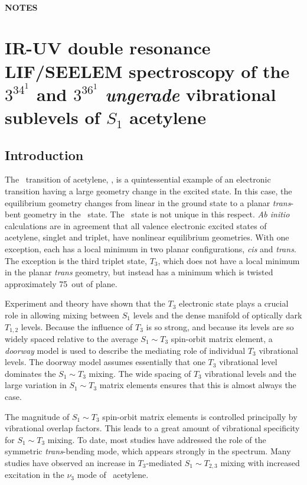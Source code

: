 \documentclass[12pt]{mitthesis}
\begin{document}
\tableofcontents
\clearpage

\subsubsection*{NOTES}
\clearpage

\chapter{IR-UV double resonance LIF/SEELEM spectroscopy of the
  $3^34^1$ and $3^36^1$ \emph{ungerade} vibrational sublevels of $S_1$
  acetylene}

\section{Introduction}

The \AtoX\ transition of acetylene, , is a quintessential
example of an electronic transition having a large geometry change in
the excited state.  In this case, the equilibrium geometry changes
from linear in the ground state to a planar \emph{trans}-bent geometry
in the \astate\ state.  The \astate\ state is not unique in this
respect.  \emph{Ab initio} calculations are in agreement that all
valence electronic excited states of acetylene, singlet and triplet,
have nonlinear equilibrium geometries.  With one exception, each has a
local minimum in two planar configurations, \emph{cis} and
\emph{trans}.  The exception is the third triplet state, $T_3$, which
does not have a local minimum in the planar \emph{trans} geometry, but
instead has a minimum which is twisted approximately 75\degrees\ out
of plane.

Experiment and theory have shown that the $T_3$ electronic state plays
a crucial role in allowing mixing between $S_1$ levels and the dense
manifold of optically dark $T_{1,2}$ levels.  Because the influence of
$T_3$ is so strong, and because its levels are so widely spaced
relative to the average $S_1 \sim T_3$ spin-orbit matrix element, a
\emph{doorway} model is used to describe the mediating role of individual
$T_3$ vibrational levels.  The doorway model assumes essentially that
one $T_3$ vibrational level dominates the $S_1 \sim T_3$ mixing.  The
wide spacing of $T_3$ vibrational levels and the large variation in $S_1
\sim T_3$ matrix elements ensures that this is almost always the case.

The magnitude of $S_1 \sim T_3$ spin-orbit matrix elements is
controlled principally by vibrational overlap factors.  This leads to
a great amount of vibrational specificity for $S_1 \sim T_3$ mixing.
To date, most studies have addressed the role of the symmetric
\emph{trans}-bending mode, which appears strongly in the \AtoX
spectrum.  Many studies have observed an increase in $T_3$-mediated
$S_1 \sim T_{2,3}$ mixing with increased excitation in the $\nu_3$
mode of \astate\ acetylene.
\end{document}
